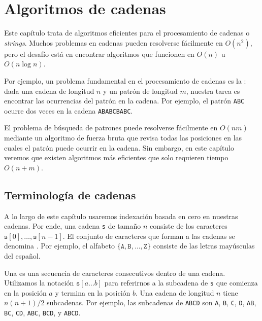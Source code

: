 \chapter{Algoritmos de cadenas}

Este capítulo trata de algoritmos eficientes para el procesamiento
de cadenas o \textit{strings}. Muchos problemas en cadenas pueden
resolverse fácilmente en $O(n^2)$, pero el desafío está en encontrar
algoritmos que funcionen en $O(n)$ u $O(n \log n)$.


Por ejemplo, un problema fundamental en el procesamiento de cadenas
es la : dada una cadena de longitud $n$ y
un patrón de longitud $m$, nuestra tarea es encontrar las ocurrencias
del patrón en la cadena. Por ejemplo, el patrón \texttt{ABC} ocurre
dos veces en la cadena \texttt{ABABCBABC}.

El problema de búsqueda de patrones puede resolverse fácilmente en
$O(nm)$ mediante un algoritmo de fuerza bruta que revisa todas las
posiciones en las cuales el patrón puede ocurrir en la cadena.
Sin embargo, en este capítulo veremos que existen algoritmos más
eficientes que solo requieren tiempo $O(n+m)$.


\section{Terminología de cadenas}


A lo largo de este capítulo usaremos indexación basada
en cero en nuestras cadenas. Por ende, una cadena \texttt{s} de tamaño
$n$ consiste de los caracteres
$\texttt{s}[0],\ldots,\texttt{s}[n-1]$.
El conjunto de caracteres que forman a las cadenas se denomina
. Por ejemplo, el alfabeto
$\{\texttt{A},\texttt{B},\ldots,\texttt{Z}\}$
consiste de las letras mayúsculas del español.


Una  es una secuencia de caracteres consecutivos dentro
de una cadena. Utilizamos la notación $\texttt{s}[a \ldots b]$ para
referirnos a la subcadena de \texttt{s} que comienza en la posición
$a$ y termina en la posición $b$. Una cadena de longitud $n$ tiene
$n(n+1)/2$ subcadenas. Por ejemplo, las subcadenas de \texttt{ABCD} son
\texttt{A}, \texttt{B}, \texttt{C}, \texttt{D},
\texttt{AB}, \texttt{BC}, \texttt{CD},
\texttt{ABC}, \texttt{BCD}, y \texttt{ABCD}.

